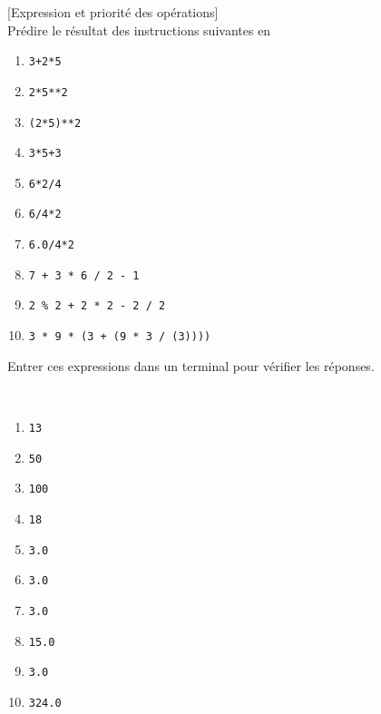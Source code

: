 \documentclass[a4paper,12pt]{article}
\newcommand{\numero}{1}                                    %
\begin{document}
\exo{}[Expression et priorité des opérations]  ~\\ 
Prédire le résultat des instructions suivantes en \py
\begin{multicols}{2}
	\begin{enumerate}[label=\alph*)]
		\item \lstinline{3+2*5}
		\item \lstinline{2*5**2}
		\item \lstinline{(2*5)**2}
		\item \lstinline{3*5+3}
		\item \lstinline{6*2/4}
		\item \lstinline{6/4*2}
		\item \lstinline{6.0/4*2}
		\item \lstinline{7 + 3 * 6 / 2 - 1}
		\item \lstinline{2 % 2 + 2 * 2 - 2 / 2}
			\item \lstinline{3 * 9 * (3 + (9 * 3 / (3))))}
		\end{enumerate}
	\end{multicols}
	Entrer ces expressions dans un terminal \py pour vérifier les réponses.
	
	\begin{correction}
	~\\ 
\begin{multicols}{2}
	\begin{enumerate}[label=\alph*)]
		\item \lstinline{13}
		\item \lstinline{50}
		\item \lstinline{100}
		\item \lstinline{18}
		\item \lstinline{3.0}
		\item \lstinline{3.0}
		\item \lstinline{3.0}
		\item \lstinline{15.0}
		\item \lstinline{3.0}
		\item \lstinline{324.0}
		\end{enumerate}
	\end{multicols}
\end{correction}
\finexo


		\newpage
		\setcounter{page}{1}
		\setcounter{section}{\numero}
		

		\section{}
	
\end{document}
